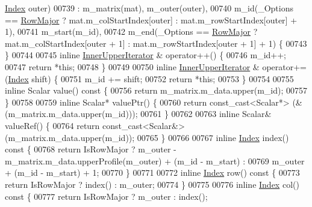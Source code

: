 \begin{DoxyCode}
      \hyperlink{group___core___module_a554f30542cc2316add4b1ea0a492ff02}{Index} outer)
00739     : m\_matrix(mat), m\_outer(outer),
00740     m\_id(\_Options == \hyperlink{group__enums_ggaacded1a18ae58b0f554751f6cdf9eb13acfcde9cd8677c5f7caf6bd603666aae3}{RowMajor} ? mat.m\_colStartIndex[outer] : mat.m\_rowStartIndex[outer] + 1),
00741     m\_start(m\_id),
00742     m\_end(\_Options == \hyperlink{group__enums_ggaacded1a18ae58b0f554751f6cdf9eb13acfcde9cd8677c5f7caf6bd603666aae3}{RowMajor} ? mat.m\_colStartIndex[outer + 1] : mat.m\_rowStartIndex[outer + 1] + 
      1) \{
00743     \}
00744 
00745     \textcolor{keyword}{inline} \hyperlink{class_eigen_1_1_skyline_matrix_1_1_inner_upper_iterator}{InnerUpperIterator} & operator++() \{
00746         m\_id++;
00747         \textcolor{keywordflow}{return} *\textcolor{keyword}{this};
00748     \}
00749 
00750     \textcolor{keyword}{inline} \hyperlink{class_eigen_1_1_skyline_matrix_1_1_inner_upper_iterator}{InnerUpperIterator} & operator+=(\hyperlink{group___core___module_a554f30542cc2316add4b1ea0a492ff02}{Index} shift) \{
00751         m\_id += shift;
00752         \textcolor{keywordflow}{return} *\textcolor{keyword}{this};
00753     \}
00754 
00755     \textcolor{keyword}{inline} Scalar value()\textcolor{keyword}{ const }\{
00756         \textcolor{keywordflow}{return} m\_matrix.m\_data.upper(m\_id);
00757     \}
00758 
00759     \textcolor{keyword}{inline} Scalar* valuePtr() \{
00760         \textcolor{keywordflow}{return} \textcolor{keyword}{const\_cast<}Scalar*\textcolor{keyword}{>} (&(m\_matrix.m\_data.upper(m\_id)));
00761     \}
00762 
00763     \textcolor{keyword}{inline} Scalar& valueRef() \{
00764         \textcolor{keywordflow}{return} \textcolor{keyword}{const\_cast<}Scalar&\textcolor{keyword}{>} (m\_matrix.m\_data.upper(m\_id));
00765     \}
00766 
00767     \textcolor{keyword}{inline} \hyperlink{group___core___module_a554f30542cc2316add4b1ea0a492ff02}{Index} index()\textcolor{keyword}{ const }\{
00768         \textcolor{keywordflow}{return} IsRowMajor ? m\_outer - m\_matrix.m\_data.upperProfile(m\_outer) + (m\_id - m\_start) :
00769                 m\_outer + (m\_id - m\_start) + 1;
00770     \}
00771 
00772     \textcolor{keyword}{inline} \hyperlink{group___core___module_a554f30542cc2316add4b1ea0a492ff02}{Index} row()\textcolor{keyword}{ const }\{
00773         \textcolor{keywordflow}{return} IsRowMajor ? index() : m\_outer;
00774     \}
00775 
00776     \textcolor{keyword}{inline} \hyperlink{group___core___module_a554f30542cc2316add4b1ea0a492ff02}{Index} col()\textcolor{keyword}{ const }\{
00777         \textcolor{keywordflow}{return} IsRowMajor ? m\_outer : index();

\end{DoxyCode}
